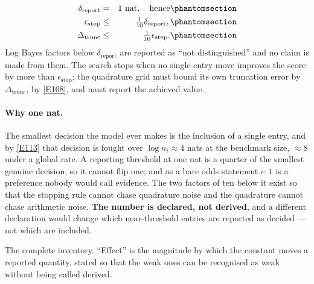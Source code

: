 \begin{definition}\label{def:thresh}
\begin{eqnarray}
\delta_{\text{report}} &=& 1\text{ nat}, \quad\text{hence}
  \Elabel{E-137A}{E137_A} \\
\epsilon_{\text{stop}} &\le& \tfrac{1}{10}\delta_{\text{report}},
  \Elabel{E-137B}{E137_B} \\
\Delta_{\text{trunc}} &\le& \tfrac{1}{10}\epsilon_{\text{stop}}.
  \Elabel{E-137C}{E137_C}
\end{eqnarray}
Log Bayes factors below $\delta_{\text{report}}$ are reported as ``not
distinguished'' and no claim is made from them. The search stops when no
single-entry move improves the score by more than $\epsilon_{\text{stop}}$; the
quadrature grid must bound its own truncation error by $\Delta_{\text{trunc}}$, by
\eqref{E108}, and must report the achieved value.
\end{definition}

\paragraph{Why one nat.} The smallest decision the model ever makes is the inclusion
of a single entry, and by \eqref{E113} that decision is fought over
$\log n_i\approx4$ nats at the benchmark size, $\approx8$ under a global rate. A
reporting threshold at one nat is a quarter of the smallest genuine decision, so it
cannot flip one; and as a bare odds statement $e:1$ is a preference nobody would call
evidence. The two factors of ten below it exist so that the stopping rule cannot
chase quadrature noise and the quadrature cannot chase arithmetic noise. \textbf{The
number is declared, not derived}, and a different declaration would change which
near-threshold entries are reported as decided --- not which are included.

The complete inventory. ``Effect'' is the magnitude by which the constant moves a
reported quantity, stated so that the weak ones can be recognised as weak without
being called derived.

